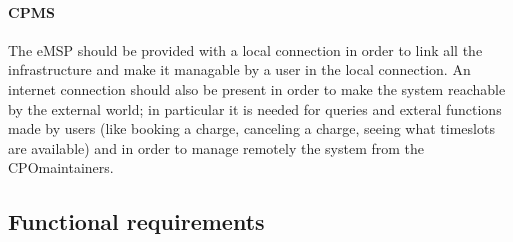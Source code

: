 \paragraph{\ac{CPMS}}
The \ac{eMSP} should be provided with a local connection in order to link all the infrastructure and make it managable by a user in the local connection.
An internet connection should also be present in order to make the system reachable by the external world; in particular it is needed for queries and exteral functions made by users (like booking a charge, canceling a charge, seeing what timeslots are available) and in order to manage remotely the system from the \ac{CPO}maintainers.

\subsection{Functional requirements}


